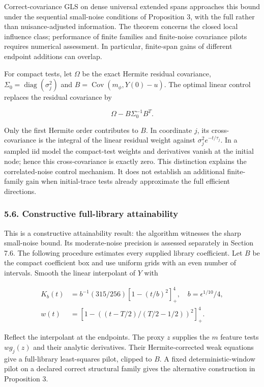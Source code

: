 \documentclass[
  american,
  11pt,
]{article}
\begin{document}
Correct-covariance GLS on dense universal extended spans approaches this
bound under the sequential small-noise conditions of Proposition 3, with
the full rather than nuisance-adjusted information. The theorem concerns
the closed local influence class; performance of finite families and
finite-noise covariance pilots requires numerical assessment. In
particular, finite-span gains of different endpoint additions can
overlap.

For compact tests, let \(\Omega\) be the exact Hermite residual
covariance, \(\Sigma_0=\operatorname{diag}(\sigma_j^2)\) and
\(B=\operatorname{Cov}(m_\phi,Y(0)-u)\). The optimal linear control
replaces the residual covariance by

\[
\Omega-B\Sigma_0^{-1}B^T.
\]

Only the first Hermite order contributes to \(B\). In coordinate \(j\),
its cross-covariance is the integral of the linear residual weight
against \(\sigma_j^2e^{-t/\tau_j}\). In a sampled iid model the
compact-test weights and derivatives vanish at the initial node; hence
this cross-covariance is exactly zero. This distinction explains the
correlated-noise control mechanism. It does not establish an additional
finite-family gain when initial-trace tests already approximate the full
efficient directions.

\subsubsection{5.6. Constructive full-library
attainability}\label{constructive-full-library-attainability}

This is a constructive attainability result: the algorithm witnesses the
sharp small-noise bound. Its moderate-noise precision is assessed
separately in Section 7.6. The following procedure estimates every
supplied library coefficient. Let \(B\) be the compact coefficient box
and use uniform grids with an even number of intervals. Smooth the
linear interpolant of \(Y\) with

\[
\begin{aligned}
K_b(t)&=b^{-1}(315/256)[1-(t/b)^2]_+^4,\quad b=\epsilon^{1/10}/4,\\
w(t)&=[1-((t-T/2)/(T/2-1/2))^2]_+^4.
\end{aligned}
\]

Reflect the interpolant at the endpoints. The proxy \(z\) supplies the
\(m\) feature tests \(w g_j(z)\) and their analytic derivatives. Their
Hermite-corrected weak equations give a full-library least-squares
pilot, clipped to \(B\). A fixed deterministic-window pilot on a
declared correct structural family gives the alternative construction in
Proposition 3.
\end{document}
